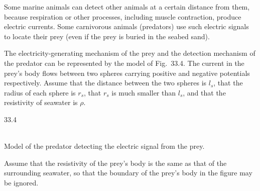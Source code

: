 Some marine animals can detect other animals at a certain distance from them, because respiration or other processes, including muscle contraction, produce electric currents. Some carnivorous animals (predators) use such electric signals to locate their prey (even if the prey is buried in the seabed sand).

The electricity-generating mechanism of the prey and the detection mechanism of the predator can be represented by the model of Fig.~33.4. The current in the prey's body flows between two spheres carrying positive and negative potentials respectively. Assume that the distance between the two spheres is $l_s$, that the radius of each sphere is $r_s$, that $r_s$ is much smaller than $l_s$, and that the resistivity of seawater is $\rho$.

\begin{figbox}{33.4}
\\[2pt]{\small Model of the predator detecting the electric signal from the prey.}
\end{figbox}

Assume that the resistivity of the prey's body is the same as that of the surrounding seawater, so that the boundary of the prey's body in the figure may be ignored.

